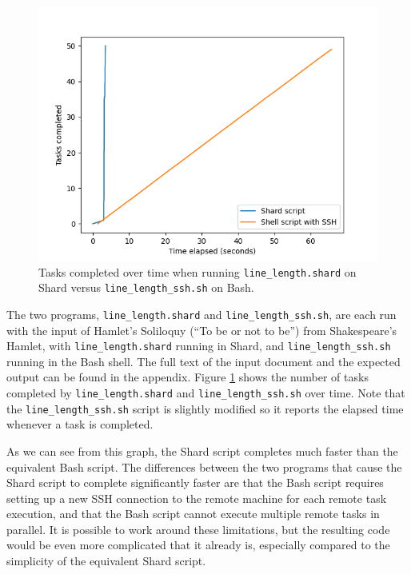 \documentclass[twoside]{report}
\begin{document}
\begin{figure}[h]
  \begin{center}
    \includegraphics[scale=0.9]{img/experiments/e12_1620960581241.png}
    \caption{Tasks completed over time when running \texttt{line\_length.shard} on Shard versus \texttt{line\_length\_ssh.sh} on Bash.}
    \label{fig:linelength}
  \end{center}
\end{figure}

\begin{sloppypar}
  The two programs, \texttt{line\_length.shard} and \texttt{line\_length\_ssh.sh}, are each run with the input of Hamlet's Soliloquy (``To be or not to be'') from Shakespeare's Hamlet, with \texttt{line\_length.shard} running in Shard, and \texttt{line\_length\_ssh.sh} running in the Bash shell.
  The full text of the input document and the expected output can be found in the appendix.
  Figure \ref{fig:linelength} shows the number of tasks completed by \texttt{line\_length.shard} and \texttt{line\_length\_ssh.sh} over time.
  Note that the \texttt{line\_length\_ssh.sh} script is slightly modified so it reports the elapsed time whenever a task is completed.
\end{sloppypar}

As we can see from this graph, the Shard script completes much faster than the equivalent Bash script.
The differences between the two programs that cause the Shard script to complete significantly faster are that the Bash script requires setting up a new SSH connection to the remote machine for each remote task execution, and that the Bash script cannot execute multiple remote tasks in parallel.
It is possible to work around these limitations, but the resulting code would be even more complicated that it already is, especially compared to the simplicity of the equivalent Shard script.
\end{document}
